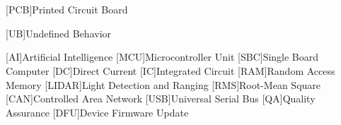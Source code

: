 \cleardoublepage
\chapter*{\listofabbrevname}
{}

\begin{acronym}[KolikMista]

	[PCB]{Printed Circuit Board}

	[UB]{Undefined Behavior}

	[AI]{Artificial Intelligence}
	[MCU]{Microcontroller Unit}
	[SBC]{Single Board Computer}
	[DC]{Direct Current}
	[IC]{Integrated Circuit}
	[RAM]{Random Access Memory}
	[LIDAR]{Light Detection and Ranging}
	[RMS]{Root-Mean Square}
	[CAN]{Controlled Area Network}
	[USB]{Universal Serial Bus}
	[QA]{Quality Assurance}
	[DFU]{Device Firmware Update}

\end{acronym}
